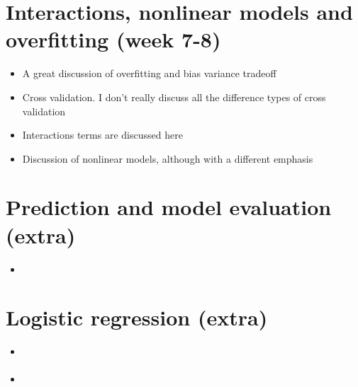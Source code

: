 \section*{Interactions, nonlinear models and overfitting (week 7-8)}
\begin{itemize}
\item A great discussion of overfitting and bias variance tradeoff \cite{mehta2019high}
\item Cross validation. I don't really discuss all the difference types of cross validation  \cite[Section 5.1]{islp}
\item Interactions terms are discussed here  \cite[Section 3.3]{islp}
\item Discussion of nonlinear models, although with a different emphasis  \cite[Chapter 7]{islp}
\end{itemize}

\section*{Prediction and model evaluation (extra)}
\begin{itemize}
\item  \cite[Section 10.5]{tabak}
\end{itemize}
\section*{Logistic regression (extra)}
\begin{itemize}
\item  \cite[Section 10.5]{tabak}
\item  \cite[Section 4.3]{islp}
\end{itemize}
\


 


 






